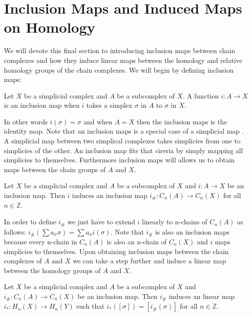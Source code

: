 \section{Inclusion Maps and Induced Maps on Homology}


We will devote this final section to introducing inclusion maps between chain complexes and how they induce linear maps between the homology and relative homology groups of the chain complexes. We will begin by defining inclusion maps:

\begin{defn} Let $X$ be a simplicial complex and $A$ be a subcomplex of $X$. A function $i: A \to X$ is an inclusion map when $i$ takes a simplex $\sigma$ in $A$ to $\sigma$ in $X$.
\end{defn}

In other words $i(\sigma) = \sigma$ and when $A = X$ then the inclusion maps is the identity map. Note that an inclusion maps is a special case of a simplicial map \cite{combinatorial-algebraic-topology}. A simplicial map between two simplical complexes takes simplicies from one to simplicies of the other. An inclusion map fits that cireria by simply mapping all simplicies to themselves. Furthermore inclusion maps will allows us to obtain maps between the chain groups of $A$ and $X$.

\begin{defn} Let $X$ be a simplicial complex and $A$ be a subcomplex of $X$ and $i: A \to X$ be an inclusion map. Then $i$ induces an inclusion map $i_\#: C_n(A) \to C_n(X)$ for all $n \in \mathbb{Z}$. \end{defn}

In order to define $i_\#$ we just have to extend $i$ linearly to n-chains of $C_n(A)$ as follows: $i_\#(\sum a_\sigma \sigma) = \sum a_\sigma i(\sigma)$. Note that $i_\#$ is also an inclusion maps because every n-chain in $C_n(A)$ is also an n-chain of $C_n(X)$ and $i$ maps simplicies to themselves. Upon obtaining inclusion maps between the chain complexes of $A$ and $X$ we can take a step further and induce a linear map between the homology groups of $A$ and $X$.

\begin{defn} Let $X$ be a simplicial complex and $A$ be a subcomplex of $X$ and $i_\#: C_n(A) \to C_n(X)$ be an inclusion map. Then $i_\#$ induces an linear map $i_*: H_n(X) \to H_n(Y)$ such that $i_*([\sigma]) = [i_\#(\sigma)]$ for all $n \in \mathbb{Z}$.
\end{defn}


